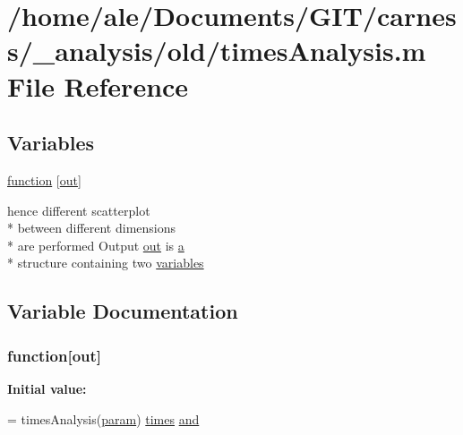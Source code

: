 \hypertarget{a00031}{\section{/home/ale/\-Documents/\-G\-I\-T/carness/\-\_\-analysis/old/times\-Analysis.m File Reference}
\label{a00031}
}
\subsection*{Variables}
\begin{DoxyCompactItemize}
\item 
\hyperlink{a00031_a370f3dd25136a73d619eba0aa2e3bb4b}{function} \mbox{[}\hyperlink{a00022_a34c820385e9209f49c18739329ad9206}{out}\mbox{]}
\item 
hence different scatterplot \\*
between different dimensions \\*
are performed Output \hyperlink{a00022_a34c820385e9209f49c18739329ad9206}{out} is \hyperlink{a00029_a2ffdbad9ea59541e59cbd2b938e0770c}{a} \\*
structure containing two \hyperlink{a00031_a075795b83d470ba58980e465541f16e9}{variables}
\end{DoxyCompactItemize}


\subsection{Variable Documentation}
\hypertarget{a00031_a370f3dd25136a73d619eba0aa2e3bb4b}{
\subsubsection[{function}]{\setlength{\rightskip}{0pt plus 5cm}function\mbox{[}{\bf out}\mbox{]}}}\label{a00031_a370f3dd25136a73d619eba0aa2e3bb4b}
{\bfseries Initial value\-:}
\begin{DoxyCode}
= timesAnalysis(\hyperlink{a00022_a51f20d6b1b54a2eee3be0e8adc96a0ae}{param})
%
      \hyperlink{a00022_a47868b053902b822eab5c738a67a633a}{times} \hyperlink{a00022_a170f8acb213f91bf71c77b1d20bceb33}{and}
\end{DoxyCode}


